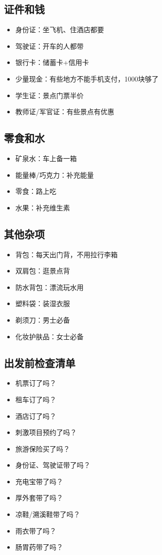 \documentclass[12pt,a4paper,UTF8]{ctexart}
\begin{document}
\subsection{证件和钱}
\begin{itemize}
\item 身份证：坐飞机、住酒店都要
\item 驾驶证：开车的人都带
\item 银行卡：储蓄卡+信用卡
\item 少量现金：有些地方不能手机支付，1000块够了
\item 学生证：景点门票半价
\item 教师证/军官证：有些景点有优惠
\end{itemize}

\subsection{零食和水}
\begin{itemize}
\item 矿泉水：车上备一箱
\item 能量棒/巧克力：补充能量
\item 零食：路上吃
\item 水果：补充维生素
\end{itemize}

\subsection{其他杂项}
\begin{itemize}
\item 背包：每天出门背，不用拉行李箱
\item 双肩包：逛景点背
\item 防水背包：漂流玩水用
\item 塑料袋：装湿衣服
\item 剃须刀：男士必备
\item 化妆护肤品：女士必备
\end{itemize}

\subsection{出发前检查清单}
\begin{itemize}
\item 机票订了吗？
\item 租车订了吗？
\item 酒店订了吗？
\item 刺激项目预约了吗？
\item 旅游保险买了吗？
\item 身份证、驾驶证带了吗？
\item 充电宝带了吗？
\item 厚外套带了吗？
\item 凉鞋/溯溪鞋带了吗？
\item 雨衣带了吗？
\item 肠胃药带了吗？
\end{itemize}
\end{document}
